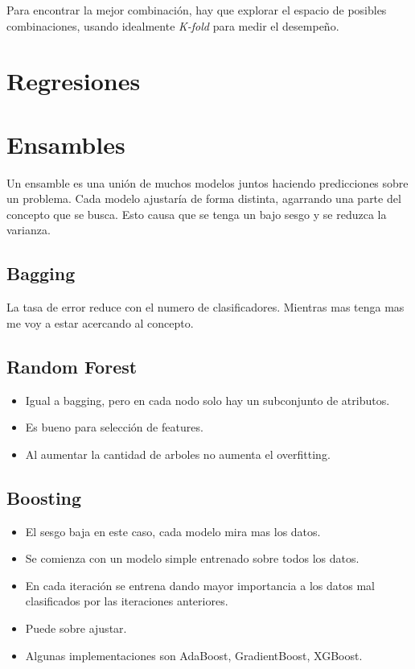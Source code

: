 \documentclass[titlepage,a4paper]{article}
\begin{document}
Para encontrar la mejor combinación, hay que explorar el espacio de posibles combinaciones, usando idealmente \textit{K-fold} para medir el desempeño.



\section{Regresiones}



\section{Ensambles}

Un ensamble es una unión de muchos modelos juntos haciendo predicciones sobre un problema. Cada modelo ajustaría de forma distinta, agarrando una parte del concepto que se busca. Esto causa que se tenga un bajo sesgo y se reduzca la varianza.


\subsection{Bagging}


La tasa de error reduce con el numero de clasificadores. Mientras mas tenga mas me voy a estar acercando al concepto.

\subsection{Random Forest}

\begin{itemize}
    \item Igual a bagging, pero en cada nodo solo hay un subconjunto de atributos.
    \item Es bueno para selección de features.
    \item Al aumentar la cantidad de arboles no aumenta el overfitting.
\end{itemize}


\subsection{Boosting}
\begin{itemize}
    \item El sesgo baja en este caso, cada modelo mira mas los datos.
    \item Se comienza con un modelo simple entrenado sobre todos los datos.
    \item En cada iteración se entrena dando mayor importancia a los datos mal clasificados por las iteraciones anteriores.
    \item Puede sobre ajustar.
    \item Algunas implementaciones son AdaBoost, GradientBoost, XGBoost.
\end{itemize}
\end{document}
